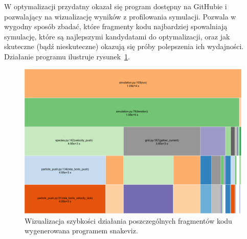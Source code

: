     W optymalizacji przydatny okazał się program \cite{snakeviz} dostępny na
    GitHubie i pozwalający na wizualizację wyników z profilowania
    symulacji. Pozwala w wygodny sposób zbadać, które fragmenty kodu najbardziej
    spowalniają symulację, które są najlepszymi kandydatami do optymalizacji, oraz
    jak skuteczne (bądź nieskuteczne) okazują się próby polepszenia ich wydajności.
    Działanie programu ilustruje rysunek~\ref{fig:snakeviz}.
    \begin{figure}[h!]
      \includegraphics[width=\textwidth]{Images/snakeviz}
      \caption{Wizualizacja szybkości działania poszczególnych fragmentów kodu
        wygenerowana programem snakeviz.}
      \label{fig:snakeviz}
    \end{figure}
